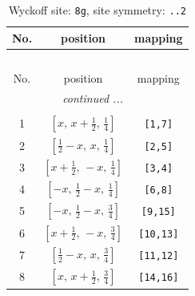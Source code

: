 \documentclass[fleqn,8pt]{jsarticle}
\begin{document}
\renewcommand{\arraystretch}{1.2}
\begin{longtable}{ccc}
\caption{Wyckoff site: {\tt 8g}, site symmetry: {\tt ..2}}
 \\
 \hline \hline
No. & position & mapping \\ \hline \endfirsthead

\multicolumn{2}{l}{\tablename\ \thetable{}} \\
 \hline \hline
No. & position & mapping \\ \hline \endhead

 \hline \hline
\multicolumn{2}{r}{\footnotesize\it continued ...} \\ \endfoot

 \hline \hline
\multicolumn{2}{r}{} \\ \endlastfoot

1 & $\left[ x,\, x + \frac{1}{2},\, \frac{1}{4} \right]$ & {\tt [1,7]} \\ \hline
2 & $\left[ \frac{1}{2} - x,\, x,\, \frac{1}{4} \right]$ & {\tt [2,5]} \\ \hline
3 & $\left[ x + \frac{1}{2},\, - x,\, \frac{1}{4} \right]$ & {\tt [3,4]} \\ \hline
4 & $\left[ - x,\, \frac{1}{2} - x,\, \frac{1}{4} \right]$ & {\tt [6,8]} \\ \hline
5 & $\left[ - x,\, \frac{1}{2} - x,\, \frac{3}{4} \right]$ & {\tt [9,15]} \\ \hline
6 & $\left[ x + \frac{1}{2},\, - x,\, \frac{3}{4} \right]$ & {\tt [10,13]} \\ \hline
7 & $\left[ \frac{1}{2} - x,\, x,\, \frac{3}{4} \right]$ & {\tt [11,12]} \\ \hline
8 & $\left[ x,\, x + \frac{1}{2},\, \frac{3}{4} \right]$ & {\tt [14,16]} \\
\end{longtable}
\renewcommand{\arraystretch}{1.2}
\end{document}
